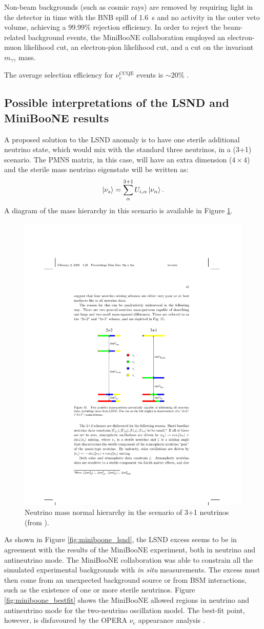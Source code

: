 Non-beam backgrounds (such as cosmic rays) are removed by requiring light in the detector in time with the BNB spill of 1.6~\si{\micro}s and no activity in the outer veto volume, achieving a 99.99\% rejection efficiency. 
In order to reject the beam-related background events, the MiniBooNE collaboration employed an electron-muon likelihood cut, an electron-pion likelihood cut, and a cut on the invariant $m_{\gamma\gamma}$ mass.

The average selection efficiency for $\nu_e^{\mathrm{CCQE}}$ events is $\sim20$\% \cite{Aguilar-Arevalo:2018gpe}.

\subsection*{Possible interpretations of the LSND and MiniBooNE results}

A proposed solution to the LSND anomaly is to have one sterile additional neutrino state, which would mix with the standard three neutrinos, in a (3+1) scenario. The PMNS matrix, in this case, will have an extra dimension ($4\times4$) and the sterile mass neutrino eigenstate will be written as:
\begin{equation}
    \ket{\nu_s}=\sum^{3+1}_{\alpha}U_{i,\alpha}\ket{\nu_{\alpha}}.
\end{equation}
A diagram of the mass hierarchy in this scenario is available in Figure \ref{fig:masslsnd}.

\begin{figure}[htbp]
    \centering
    \includegraphics[width=0.3\linewidth]{figures/masslsnd.pdf}
    \caption{Neutrino mass normal hierarchy in the scenario of 3+1 neutrinos (from \cite{deGouvea:2004gd}).}
    \label{fig:masslsnd}
\end{figure}

As shown in Figure \ref{fig:miniboone_lsnd}, the LSND excess seems to be in agreement with the results of the MiniBooNE experiment, both in neutrino and antineutrino mode. The MiniBooNE collaboration was able to constrain all the simulated experimental backgrounds with \emph{in situ} measurements. The excess must then come from an unexpected background source or from BSM interactions, such as the existence of one or more sterile neutrinos.
Figure \ref{fig:miniboone_bestfit} shows the MiniBooNE allowed regions in neutrino and antineutrino mode for the two-neutrino oscillation model. The best-fit point, however, is disfavoured by the OPERA $\nu_{e}$ appearance analysis \cite{Agafonova:2018dkb}.


